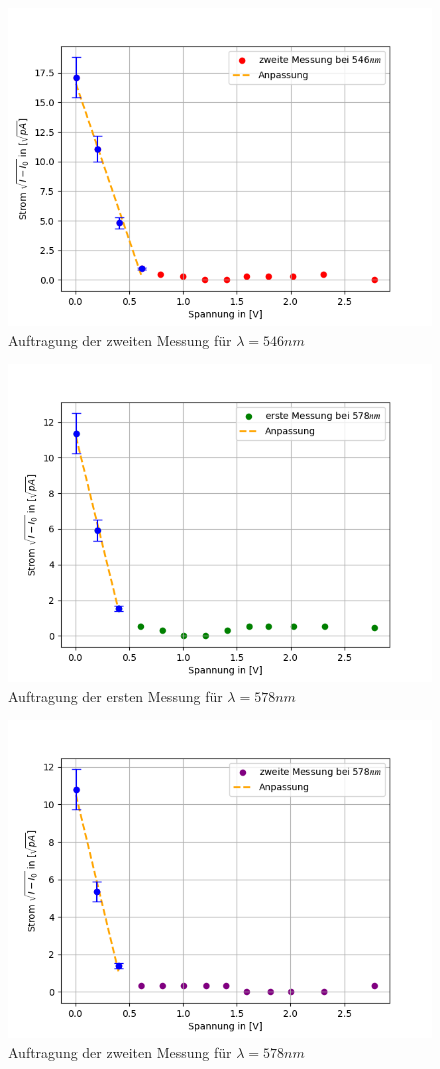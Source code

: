 \documentclass{article}
\begin{document}
\begin{figure}[h!]
  \centering
  \includegraphics[width=.8\linewidth]{402_546nm_b.png}
  \caption{Auftragung der zweiten Messung für $\lambda =546nm$}
  \label{fig:wellenlaenge_546nm_b}
\end{figure}

\begin{figure}[h!]
  \centering
  \includegraphics[width=.8\linewidth]{402_578nm_a.png}
  \caption{Auftragung der ersten Messung für $ \lambda =578nm$}
  \label{fig:wellenlaenge_578nm_a}
\end{figure}

\begin{figure}[h!]
  \centering
  \includegraphics[width=.8\linewidth]{402_578nm_b.png}
  \caption{Auftragung der zweiten Messung für $\lambda =578nm$}
  \label{fig:wellenlaenge_578nm_b}
\end{figure}
\end{document}
